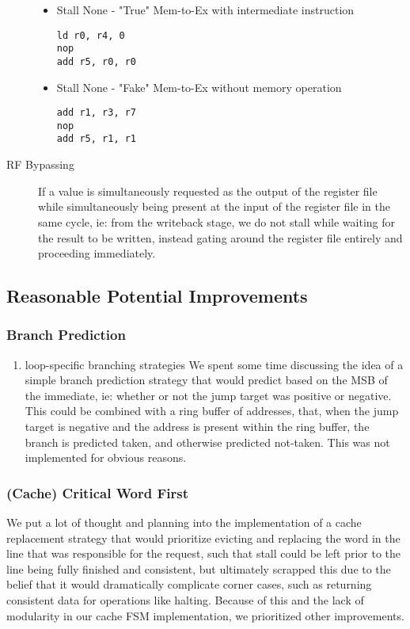 \documentclass[11pt]{article}
\begin{document}
\begin{description}
\begin{itemize}
\item Stall None - "True" Mem-to-Ex with intermediate instruction
\begin{verbatim}
ld r0, r4, 0
nop
add r5, r0, r0
\end{verbatim}

\item Stall None - "Fake" Mem-to-Ex without memory operation 
\begin{verbatim}
add r1, r3, r7
nop
add r5, r1, r1
\end{verbatim}
\end{itemize}

\item[{RF Bypassing}] If a value is simultaneously requested as the
output of the register file while simultaneously being present
at the input of the register file in the same cycle, ie: from
the writeback stage, we do not stall while waiting for the
result to be written, instead gating around the register file
entirely and proceeding immediately.
\end{description}

\subsection{Reasonable Potential Improvements}
\label{sec:org0006bb9}
\subsubsection{Branch Prediction}
\label{sec:org540f791}
\begin{enumerate}
\item loop-specific branching strategies
\label{sec:orgd1154d5}
We spent some time discussing the idea of a simple branch
prediction strategy that would predict based on the MSB of the
immediate, ie: whether or not the jump target was positive or
negative. This could be combined with a ring buffer of addresses,
that, when the jump target is negative and the address is present
within the ring buffer, the branch is predicted taken, and
otherwise predicted not-taken. This was not implemented for
obvious reasons.
\end{enumerate}
\subsubsection{(Cache) Critical Word First}
\label{sec:org856f7d0}
We put a lot of thought and planning into the implementation of a
cache replacement strategy that would prioritize evicting and
replacing the word in the line that was responsible for the
request, such that stall could be left prior to the line being
fully finished and consistent, but ultimately scrapped this due
to the belief that it would dramatically complicate corner cases,
such as returning consistent data for operations like
halting. Because of this and the lack of modularity in our cache
FSM implementation, we prioritized other improvements.
\end{document}
